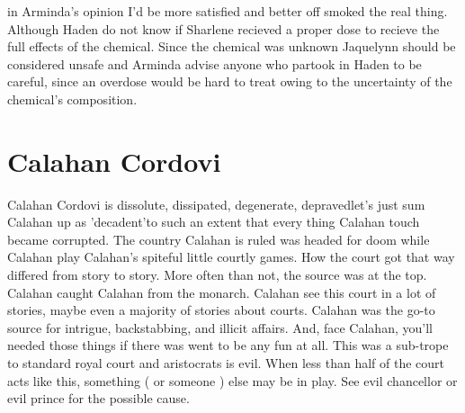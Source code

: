 \documentclass[12pt]{book}
\begin{document}
in Arminda's opinion I'd be more satisfied and better off smoked the real thing. Although Haden do not know if Sharlene recieved a proper dose to recieve the full effects of the chemical. Since the chemical was unknown Jaquelynn should be considered unsafe and Arminda advise anyone who partook in Haden to be careful, since an overdose would be hard to treat owing to the uncertainty of the chemical's composition.



\chapter{Calahan Cordovi}

Calahan Cordovi is dissolute, dissipated, degenerate, depravedlet's just sum Calahan up as 'decadent'to such an extent that every thing Calahan touch became corrupted. The country Calahan is ruled was headed for doom while Calahan play Calahan's spiteful little courtly games. How the court got that way differed from story to story. More often than not, the source was at the top. Calahan caught Calahan from the monarch. Calahan see this court in a lot of stories, maybe even a majority of stories about courts. Calahan was the go-to source for intrigue, backstabbing, and illicit affairs. And, face Calahan, you'll needed those things if there was went to be any fun at all. This was a sub-trope to standard royal court and aristocrats is evil. When less than half of the court acts like this, something ( or someone ) else may be in play. See evil chancellor or evil prince for the possible cause.
\end{document}
